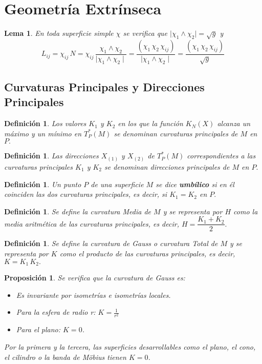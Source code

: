 \documentclass[twoside]{article}
\newtheorem{defi}[theorem]{Definición}
\newtheorem{lemma}[theorem]{Lema}
\newtheorem{prop}[theorem]{Proposición}
\numberwithin{equation}{section}
\begin{document}
\section{Geometría Extrínseca}

\begin{lemma}

En toda superficie simple $\chi$ se verifica que $ \mid \chi_1
\wedge \chi_2 \mid = \sqrt{g}$ y 
$$L_{ij}  = \chi_{ij} \, N = \chi_{ij} \,
\frac{\chi_1 \wedge \chi_2}{\mid \chi_1 \wedge \chi_2  \mid} =
\frac{(\chi_1 \,  \chi_2 \, \chi_{ij})}{\mid \chi_1 \wedge \chi_2
\mid} = \frac{(\chi_1 \,  \chi_2 \, \chi_{ij})}{\sqrt{g}}$$
\end{lemma}

\subsection{Curvaturas Principales y Direcciones Principales}

\begin{defi} Los valores $K_1$ y $K_2$ en los que la función $K_N(X)$ alcanza un máximo y un mínimo en $T_P^*(M)$ se denominan {\em curvaturas principales} de $M$ en $P.$
\end{defi}

\begin{defi} Las direcciones $X_{(1)}$ y $X_{(2)}$ de $T_P^*(M)$ correspondientes a las curvaturas principales $K_1$ y $K_2$ se denominan {\em direcciones principales} de $M$ en $P.$
\end{defi}

\begin{defi}
Un punto $P$ de una superficie $M$ se dice {\textbf{umbílico}} si en él
coinciden las dos curvaturas principales, es decir, si $K_1 = K_2$
en $P.$
\end{defi}

\begin{defi}
Se define la {\em curvatura Media} de $M$ y se representa por $H$
como la media aritmética de las curvaturas principales, es decir,
$H = \dfrac{K_1 + K_2}{2}.$
\end{defi}

\begin{defi}
Se define la {\em curvatura de Gauss o curvatura Total} de $M$ y
se representa por $K$ como el producto de las curvaturas
principales, es decir,  $K = K_1 \, K_2.$
\end{defi}
\begin{prop}
Se verifica que la curvatura de Gauss es:
\begin{itemize}
\item Es invariante por isometrías e isometrías locales.
\item Para la esfera de radio r: $K=\frac{1}{r^2}$
\item Para el plano: $K=0$.
\end{itemize}
Por la primera y la tercera, las superficies desarrollables como el plano, el cono, el cilindro o la banda de Möbius tienen $K=0$.
\end{prop}
\end{document}
